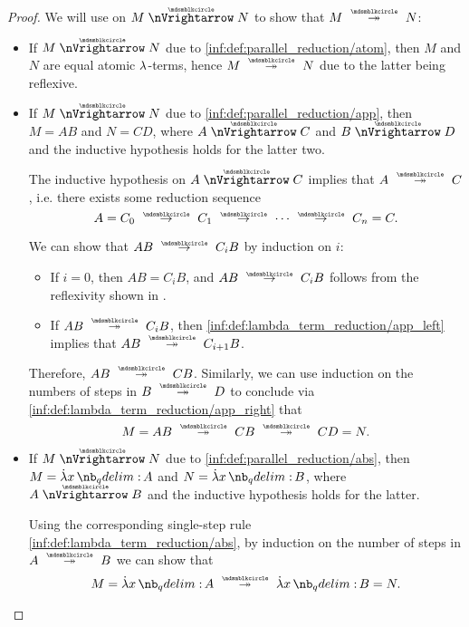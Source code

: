 \begin{proof}
   We will use  on \( M \ppred N \) to show that \( M \pred* N \):
  \begin{itemize}
    \item If \( M \ppred N \) due to \ref{inf:def:parallel_reduction/atom}, then \( M \) and \( N \) are equal atomic \( {\mathrm \lambda} \)-terms, hence \( M \pred* N \) due to the latter being reflexive.

    \item If \( M \ppred N \) due to \ref{inf:def:parallel_reduction/app}, then \( M = AB \) and \( N = CD \), where \( A \ppred C \) and \( B \ppred D \) and the inductive hypothesis holds for the latter two.

    The inductive hypothesis on \( A \ppred C \) implies that \( A \pred* C \), i.e. there exists some reduction sequence
    \begin{equation*}
      A = C_0 \pred C_1 \pred \cdots \pred C_n = C.
    \end{equation*}

    We can show that \( AB \pred C_i B \) by induction on \( i \):
    \begin{itemize}
      \item If \( i = 0 \), then \( AB = C_i B \), and \( AB \pred C_i B \) follows from the reflexivity shown in .

      \item If \( AB \pred* C_i B \), then \ref{inf:def:lambda_term_reduction/app_left} implies that \( AB \pred* C_{i+1} B \).
    \end{itemize}

    Therefore, \( AB \pred* CB \). Similarly, we can use induction on the numbers of steps in \( B \pred* D \) to conclude via \ref{inf:def:lambda_term_reduction/app_right} that
    \begin{equation*}
      M = AB \pred* CB \pred* CD = N.
    \end{equation*}

    \item If \( M \ppred N \) due to \ref{inf:def:parallel_reduction/abs}, then \( M = \qabs x A \) and \( N = \qabs x B \), where \( A \ppred B \) and the inductive hypothesis holds for the latter.

    Using the corresponding single-step rule \ref{inf:def:lambda_term_reduction/abs}, by induction on the number of steps in \( A \pred* B \) we can show that
    \begin{equation*}
      M = \qabs x A \pred* \qabs x B = N.
    \end{equation*}


\end{itemize}
\end{proof}
